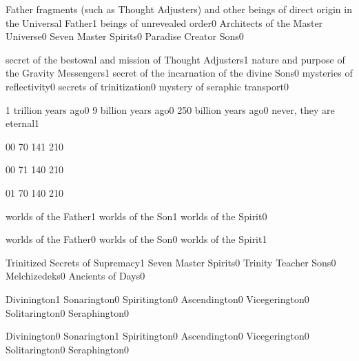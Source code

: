 {Father fragments (such as Thought Adjusters) and other beings of direct origin in the Universal Father}{1}
{beings of unrevealed order}{0}
{Architects of the Master Universe}{0}
{Seven Master Spirits}{0}
{Paradise Creator Sons}{0}
\qstop

{secret of the bestowal and mission of Thought Adjusters}{1}
{nature and purpose of the Gravity Messengers}{1}
{secret of the incarnation of the divine Sons}{0}
{mysteries of reflectivity}{0}
{secrets of trinitization}{0}
{mystery of seraphic transport}{0}
\qstop

{1 trillion years ago}{0}
{9 billion years ago}{0}
{250 billion years ago}{0}
{never, they are eternal}{1}
\qstop

{0}{0}
{7}{0}
{14}{1}
{21}{0}
\qstop

{0}{0}
{7}{1}
{14}{0}
{21}{0}
\qstop

{0}{1}
{7}{0}
{14}{0}
{21}{0}
\qstop

{worlds of the Father}{1}
{worlds of the Son}{1}
{worlds of the Spirit}{0}
\qstop

{worlds of the Father}{0}
{worlds of the Son}{0}
{worlds of the Spirit}{1}
\qstop

{Trinitized Secrets of Supremacy}{1}
{Seven Master Spirits}{0}
{Trinity Teacher Sons}{0}
{Melchizedeks}{0}
{Ancients of Days}{0}
\qstop

{Divinington}{1}
{Sonarington}{0}
{Spiritington}{0}
{Ascendington}{0}
{Vicegerington}{0}
{Solitarington}{0}
{Seraphington}{0}
\qstop

{Divinington}{0}
{Sonarington}{1}
{Spiritington}{0}
{Ascendington}{0}
{Vicegerington}{0}
{Solitarington}{0}
{Seraphington}{0}
\qstop

